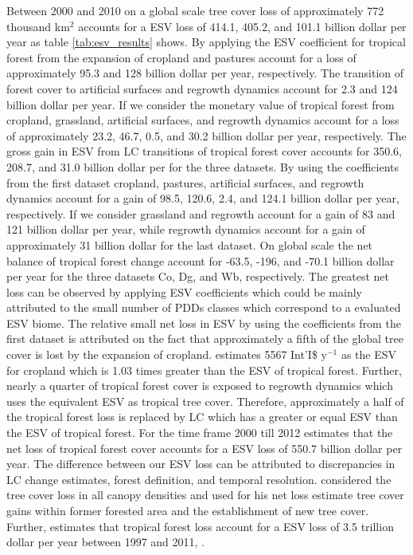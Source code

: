 		Between 2000 and 2010 on a global scale tree cover loss of approximately 772 thousand km$^2$ accounts for a \ac{ESV} loss of 414.1, 405.2, and 101.1 billion dollar per year as table \ref{tab:esv_results} shows. By applying the \ac{ESV} coefficient for tropical forest from \citet{Costanza2014} the expansion of cropland and pastures account for a loss of approximately 95.3 and 128 billion dollar per year, respectively. The transition of forest cover to artificial surfaces and regrowth dynamics account for 2.3 and 124 billion dollar per year. If we consider the monetary value of tropical forest from \citet{Siikamaki2015} cropland, grassland, artificial surfaces, and regrowth dynamics account for a loss of approximately 23.2, 46.7, 0.5, and 30.2 billion dollar per year, respectively. The gross gain in \ac{ESV} from \ac{LC} transitions of tropical forest cover accounts for 350.6, 208.7, and 31.0 billion dollar per for the three datasets. By using the coefficients from the first dataset cropland, pastures, artificial surfaces, and regrowth dynamics account for a gain of 98.5, 120.6, 2.4, and 124.1 billion dollar per year, respectively. If we consider \citet{Groot2012} grassland and regrowth account for a gain of 83 and 121 billion dollar per year, while regrowth dynamics account for a gain of approximately 31 billion dollar for the last dataset. On global scale the net balance of tropical forest change account for -63.5, -196, and -70.1 billion dollar per year for the three datasets Co, Dg, and Wb, respectively. The greatest net loss can be observed by applying \citeauthor{Groot2012} \ac{ESV} coefficients which could be mainly attributed to the small number of \acp{PDD} classes which correspond to a evaluated \ac{ESV} biome. The relative small net loss in \ac{ESV} by using the coefficients from the first dataset is attributed on the fact that approximately a fifth of the global tree cover is lost by the expansion of cropland. \citeauthor{Costanza2014} estimates 5567 Int'I\$ y$^{-1}$ as the \ac{ESV} for cropland which is 1.03 times greater than the \ac{ESV} of tropical forest. Further, nearly a quarter of tropical forest cover is exposed to regrowth dynamics which uses the equivalent \ac{ESV} as tropical tree cover. Therefore, approximately a half of the tropical forest loss is replaced by \ac{LC} which has a greater or equal \ac{ESV} than the \ac{ESV} of tropical forest. For the time frame 2000 till 2012 \citet{Song2018} estimates that the net loss of tropical forest cover accounts for a \ac{ESV} loss of 550.7 billion dollar per year. The difference between our \ac{ESV} loss can be attributed to discrepancies in \ac{LC} change estimates, forest definition, and temporal resolution. \citeauthor{Song2018} considered the tree cover loss in all canopy densities and used for his net loss estimate tree cover gains within former forested area and the establishment of new tree cover. Further, \citet{Costanza2014} estimates that tropical forest loss account for a \ac{ESV} loss of 3.5 trillion dollar per year between 1997 and 2011, .


